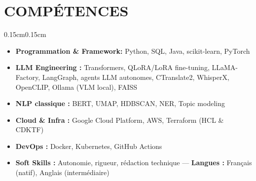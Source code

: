 \documentclass[9pt,letterpaper]{extarticle}
\newenvironment{spaciouslist}{
  \begin{itemize}[
    leftmargin=0.8em,
    itemsep=4pt,
    topsep=1pt,
    parsep=0pt,
    partopsep=0pt
  ]
}{
  \end{itemize}
}
\newenvironment{onecolentry}{
  \begin{adjustwidth}{0.15cm}{0.15cm}
}{
  \end{adjustwidth}
}
\begin{document}
\vspace{0.10cm}
\section{COMPÉTENCES}
\begin{onecolentry}
\begin{spaciouslist}
    \item \textbf{Programmation \& Framework: } Python, SQL, Java, scikit-learn, PyTorch
    \item \textbf{LLM Engineering :} Transformers, QLoRA/LoRA fine-tuning, LLaMA-Factory, LangGraph, agents LLM autonomes, CTranslate2, WhisperX, OpenCLIP, Ollama (VLM local), FAISS
    \item \textbf{NLP classique :} BERT, UMAP, HDBSCAN, NER, Topic modeling
    \item \textbf{Cloud \& Infra :} Google Cloud Platform, AWS, Terraform (HCL \& CDKTF)
    \item \textbf{DevOps :} Docker, Kubernetes, GitHub Actions
    \item \textbf{Soft Skills :} Autonomie, rigueur, rédaction technique — \textbf{Langues :} Français (natif), Anglais (intermédiaire)
\end{spaciouslist}
\end{onecolentry}
\end{document}
